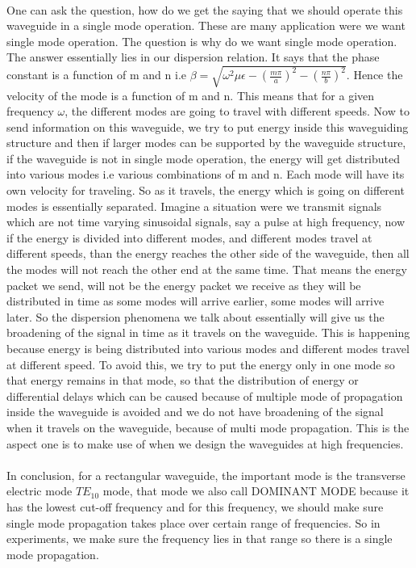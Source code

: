 	  \paragraph{}One can ask the question, how do we get the saying that we should operate this waveguide in a single mode operation. These are many application were we want single mode operation. The question is why do we want single mode operation. The answer essentially lies in our dispersion relation. It says that the phase constant is a function of m and n i.e $\beta = \sqrt{{\omega}^2\mu\epsilon - (\frac{m\pi}{a})^2 - (\frac{n\pi}{b})^2}.$ Hence the velocity of the mode is a function of m and n. This means that for a given frequency $\omega$, the different modes are going to travel with different speeds. Now to send information on this waveguide, we try to put energy inside this waveguiding structure and then if larger modes can be supported by the waveguide structure, if the waveguide is not in single mode operation, the energy will get distributed into various modes i.e various combinations of m and n. Each mode will have its own velocity for traveling. So as it travels, the energy which is going on different modes is essentially separated. Imagine a situation were we transmit signals which are not time varying sinusoidal signals, say a pulse at high frequency, now if the energy is divided into different modes, and different modes travel at different speeds, than the energy reaches the other side of the waveguide, then all the modes will not reach the other end at the same time. That means the energy packet we send, will not be the energy packet we receive as they will be distributed in time as some modes will arrive earlier, some modes will arrive later. So the dispersion phenomena we talk about essentially will give us the broadening of the signal in time as it travels on the waveguide. This is happening because energy is being distributed into various modes and different modes travel at different speed. To avoid this, we try to put the energy only in one mode so that energy remains in that mode, so that the distribution of energy or differential delays which can be caused because of multiple mode of propagation inside the waveguide is avoided and we do not have broadening of the signal when it travels on the waveguide, because of multi mode propagation. This is the aspect one is to make use of when we design the waveguides at high frequencies.
	  \paragraph{}In conclusion, for a rectangular waveguide, the important mode is the transverse electric mode $TE_{10}$ mode, that mode we also call DOMINANT MODE because it has the lowest cut-off frequency and for this frequency, we should make sure single mode propagation takes place over certain range of frequencies. So in experiments, we make sure the frequency lies in that range so there is a single mode propagation.
  